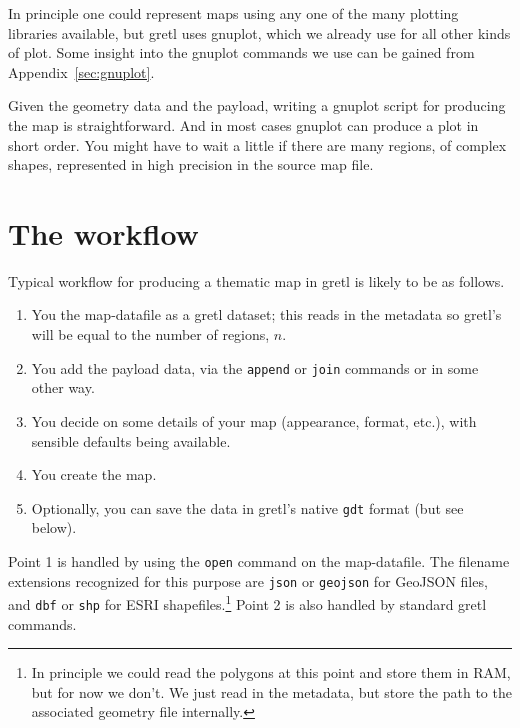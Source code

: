 \documentclass{article}
\begin{document}
In principle one could represent maps using any one of the many
plotting libraries available, but gretl uses \textsf{gnuplot}, which
we already use for all other kinds of plot. Some insight into the
\textsf{gnuplot} commands we use can be gained from
Appendix~\ref{sec:gnuplot}.

Given the geometry data and the payload, writing a \textsf{gnuplot}
script for producing the map is straightforward. And in most cases
\textsf{gnuplot} can produce a plot in short order. You might have to
wait a little if there are many regions, of complex shapes,
represented in high precision in the source map file.

\section{The workflow}
\label{sec:workflow}

Typical workflow for producing a thematic map in gretl is likely to be
as follows.

\begin{enumerate}
\item You  the map-datafile as a gretl dataset; this reads
  in the metadata so gretl's  will be equal to the number
  of regions, $n$.
\item You add the payload data, via the \texttt{append} or
  \texttt{join} commands or in some other way.
\item You decide on some details of your map (appearance, format,
  etc.), with sensible defaults being available.
\item You create the map.
\item Optionally, you can save the data in gretl's native \texttt{gdt}
  format (but see below).
\end{enumerate}

Point 1 is handled by using the \texttt{open} command on the
map-datafile. The filename extensions recognized for this purpose are
\texttt{json} or \texttt{geojson} for GeoJSON files, and \texttt{dbf}
or \texttt{shp} for ESRI shapefiles.\footnote{In principle we could
  read the polygons at this point and store them in RAM, but for now
  we don't. We just read in the metadata, but store the path to the
  associated geometry file internally.} Point 2 is also handled by
standard gretl commands.
\end{document}
